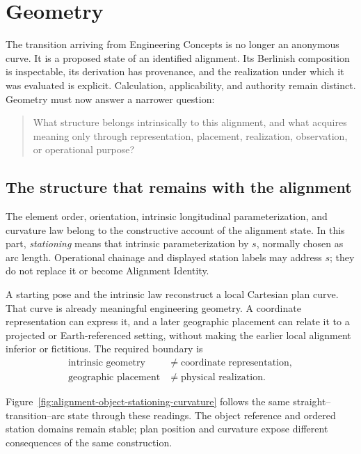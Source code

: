 
\chapter*{Geometry}
{}

The transition arriving from Engineering Concepts is no longer an anonymous
curve. It is a proposed state of an identified alignment. Its Berlinish
composition is inspectable, its derivation has provenance, and the realization
under which it was evaluated is explicit. Calculation, applicability, and
authority remain distinct. Geometry must now answer a narrower question:

\begin{quote}
What structure belongs intrinsically to this alignment, and what acquires
meaning only through representation, placement, realization, observation, or
operational purpose?
\end{quote}

\section*{The structure that remains with the alignment}

The element order, orientation, intrinsic longitudinal parameterization, and
curvature law belong to the constructive account of the alignment state. In
this part, \emph{stationing} means that intrinsic parameterization by $s$,
normally chosen as arc length. Operational chainage and displayed station
labels may address $s$; they do not replace it or become Alignment Identity.

A starting pose and the intrinsic law reconstruct a local Cartesian plan
curve. That curve is already meaningful engineering geometry. A coordinate
representation can express it, and a later geographic placement can relate it
to a projected or Earth-referenced setting, without making the earlier local
alignment inferior or fictitious. The required boundary is
\[
\begin{aligned}
\text{intrinsic geometry}&\neq\text{coordinate representation},\\
\text{geographic placement}&\neq\text{physical realization}.
\end{aligned}
\]

Figure~\ref{fig:alignment-object-stationing-curvature} follows the same
straight--transition--arc state through these readings. The object reference
and ordered station domains remain stable; plan position and curvature expose
different consequences of the same construction.

